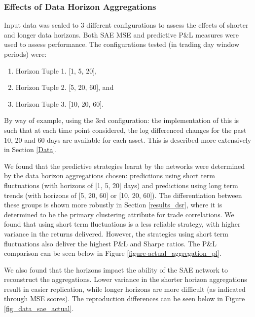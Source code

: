 \documentclass[a4paper,11pt,oneside]{article}
\theoremstyle{plain}
\theoremstyle{definition}
\begin{document}
	\subsubsection{Effects of Data Horizon Aggregations}
	
	Input data was scaled to 3 different configurations to assess the effects of shorter and longer data horizons. Both SAE MSE and predictive P\&L measures were used to assess performance. The configurations tested (in trading day window periods) were:
	
	\begin{enumerate}
		\item Horizon Tuple 1. [1, 5, 20],
		\item Horizon Tuple 2. [5, 20, 60], and
		\item Horizon Tuple 3. [10, 20, 60].
	\end{enumerate}
	
	By way of example, using the 3rd configuration: the implementation of this is such that at each time point considered, the log differenced changes for the past 10, 20 and 60 days are available for each asset. This is described more extensively in Section \ref{Data}.\newline
	
	We found that the predictive strategies learnt by the networks were determined by the data horizon aggregations chosen: predictions using short term fluctuations (with horizons of [1, 5, 20] days) and predictions using long term trends (with horizons of [5, 20, 60] or [10, 20, 60]). The differentiation between these groups is shown more robustly in Section \ref{results_dsr}, where it is determined to be the primary clustering attribute for trade correlations.  We found that using short term fluctuations is a less reliable strategy, with higher variance in the returns delivered. However, the strategies using short term fluctuations also deliver the highest P\&L and Sharpe ratios. The P\&L comparison can be seen below in Figure \ref{figure-actual_aggregation_pl}. \newline

	We also found that the horizons impact the ability of the SAE network to reconstruct the aggregations. Lower variance in the shorter horizon aggregations result in easier replication, while longer horizons are more difficult (as indicated through MSE scores). The reproduction differences can be seen below in Figure \ref{fig_data_sae_actual}.	
	
\end{document}
